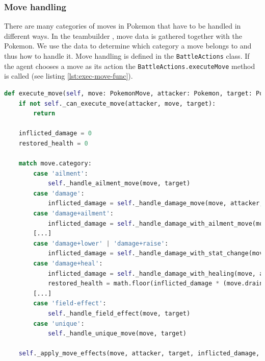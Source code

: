 \subsubsection{Move handling}
There are many categories of moves in Pokemon that have to be handled in different ways. In the teambuilder \cite{TeambuilderCli}, 
move data is gathered together with the Pokemon. We use the data to determine which category a move belongs to and thus how 
to handle it. Move handling is defined in the \lstinline|BattleActions| class. If the agent chooses a move as its action 
the \lstinline|BattleActions.executeMove| method is called (see listing \ref{lst:exec-move-func}).

\begin{lstlisting}[language=Python,caption={Excerpt of the execute move function.},float=h,label=lst:exec-move-func,breaklines]
def execute_move(self, move: PokemonMove, attacker: Pokemon, target: Pokemon):
    if not self._can_execute_move(attacker, move, target):
        return

    inflicted_damage = 0
    restored_health = 0

    match move.category:
        case 'ailment':
            self._handle_ailment_move(move, target)
        case 'damage':
            inflicted_damage = self._handle_damage_move(move, attacker, target)
        case 'damage+ailment':
            inflicted_damage = self._handle_damage_with_ailment_move(move, attacker, target)
        [...]
        case 'damage+lower' | 'damage+raise':
            inflicted_damage = self._handle_damage_with_stat_change(move, attacker, target)
        case 'damage+heal':
            inflicted_damage = self._handle_damage_with_healing(move, attacker, target)
            restored_health = math.floor(inflicted_damage * (move.drain / 100))
        [...]
        case 'field-effect':
            self._handle_field_effect(move, target)
        case 'unique':
            self._handle_unique_move(move, target)

    self._apply_move_effects(move, attacker, target, inflicted_damage, restored_health)
\end{lstlisting}
